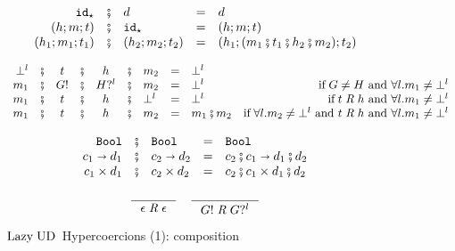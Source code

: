 \documentclass[runningheads]{llncs}
\newcommand{\infr}[2]{\inference{#1}{#2}}
\newcommand{\sidecond}[1]{\text{if}\;#1}
\newcommand{\LUD}{\ensuremath{\text{Lazy\;UD}}}
\newcommand{\Tdyn}[0]{\ensuremath{\star}}
\newcommand{\Pbool}[0]{\ensuremath{\mathtt{Bool}}}
\newcommand{\Pfunc}[2]{\ensuremath{#1 \shortrightarrow #2}}
\newcommand{\Pprod}[2]{\ensuremath{#1 \times #2}}
\newcommand{\cnfid}[1]{\ensuremath{\mathtt{id}_{#1}}}
\newcommand{\hcci}[0]{\cnfid{\Tdyn}}
\newcommand{\hccc}[3]{\ensuremath{(#1;#2;#3)}}
\newcommand{\hche}[0]{\ensuremath{\epsilon}}
\newcommand{\hchp}[2]{\ensuremath{#1?^{#2}}}
\newcommand{\hcmbool}[0]{\Pbool}
\newcommand{\hcmfunc}[2]{\Pfunc{#1}{#2}}
\newcommand{\hcmprod}[2]{\Pprod{#1}{#2}}
\newcommand{\hcmfail}[1]{\ensuremath{\bot^l}}
\newcommand{\hcte}[0]{\ensuremath{\epsilon}}
\newcommand{\hcti}[1]{\ensuremath{#1!}}
\newcommand{\compatibletailhead}[2]{\ensuremath{#1\;\mathit{R}\;#2}}
\begin{document}
\begin{figure}[tp]
	\[
	\begin{array}{rclcl}
		\hcci          
		& \fatsemi & d
		& = & d \\
		\hccc{h}{m}{t}
		& \fatsemi & \hcci
		& = & \hccc{h}{m}{t} \\
		\hccc{h_1}{m_1}{t_1}
		& \fatsemi & \hccc{h_2}{m_2}{t_2}
		& = & \hccc{h_1}{(m_1 \fatsemi t_1 \fatsemi h_2 \fatsemi m_2)}{t_2}
	\end{array}
	\]

	\[
	\begin{array}{rccccclclr}
	\hcmfail{l} 
	& \fatsemi & t
	& \fatsemi & h
	& \fatsemi & m_2
	& = & \hcmfail{l} \\
	m_1
	& \fatsemi & \hcti{G}
	& \fatsemi & \hchp{H}{l}
	& \fatsemi & m_2
	& = & \hcmfail{l}
	& \sidecond{G \neq H \text{ and } \forall l. m_1 \neq \hcmfail{l}} \\
	m_1
	& \fatsemi & t
	& \fatsemi & h
	& \fatsemi & \hcmfail{l}
	& = & \hcmfail{l}
	& \sidecond{\compatibletailhead{t}{h}
		\text{ and } \forall l. m_1 \neq \hcmfail{l}} \\
	m_1
	& \fatsemi & t
	& \fatsemi & h
	& \fatsemi & m_2
	& = & m_1 \fatsemi m_2
	& \sidecond{
		\forall l. m_2 \neq \hcmfail{l}
		\text{ and } \compatibletailhead{t}{h}
		\text{ and } \forall l. m_1 \neq \hcmfail{l}} \\
	\end{array}
	\]
	
	\[
	\begin{array}{rclcl}
	\hcmbool
	& \fatsemi & \hcmbool
	& = & \hcmbool \\
	\hcmfunc{c_1}{d_1}
	& \fatsemi & \hcmfunc{c_2}{d_2}
	& = & \hcmfunc{c_2 \fatsemi c_1}{d_1 \fatsemi d_2} \\
	\hcmprod{c_1}{d_1}
	& \fatsemi & \hcmprod{c_2}{d_2}
	& = & \hcmprod{c_2 \fatsemi c_1}{d_1 \fatsemi d_2} \\
	\end{array}
	\]
	
	\fbox{\compatibletailhead{t}{h}}
	\begin{gather*}
	\infr{}{\compatibletailhead{\hcte}{\hche}}
	\quad
	\infr{}{\compatibletailhead{\hcti{G}}{\hchp{G}{l}}}
	\end{gather*}
	
\caption{\LUD\ Hypercoercions (1): composition}
\label{fig:LazyUD-Hypercoercions-composition}
\end{figure}
\end{document}
